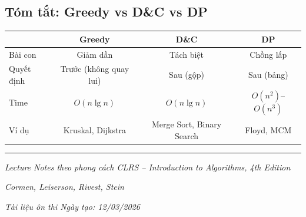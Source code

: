 \documentclass[10pt]{article}
\begin{document}
\subsection{Tóm tắt: Greedy vs D\&C vs DP}

\begin{center}
{\footnotesize
\begin{tabular}{|l|c|c|c|}
\hline
 & \textbf{Greedy} & \textbf{D\&C} & \textbf{DP} \\
\hline\hline
Bài con & Giảm dần & Tách biệt & Chồng lấp \\
\hline
Quyết định & Trước (không quay lui) & Sau (gộp) & Sau (bảng) \\
\hline
Time & $O(n \lg n)$ & $O(n \lg n)$ & $O(n^2)$--$O(n^3)$ \\
\hline
Ví dụ & Kruskal, Dijkstra & Merge Sort, Binary Search & Floyd, MCM \\
\hline
\end{tabular}
}
\label{tab:quick-ref-3methods}
\end{center}

\begin{center}\rule{0.5\linewidth}{0.5pt}\end{center}

\emph{Lecture Notes theo phong cách CLRS -- Introduction to Algorithms,
4th Edition}

\emph{Cormen, Leiserson, Rivest, Stein}

\emph{Tài liệu ôn thi \textbar{} Ngày tạo: 12/03/2026}
\end{document}

